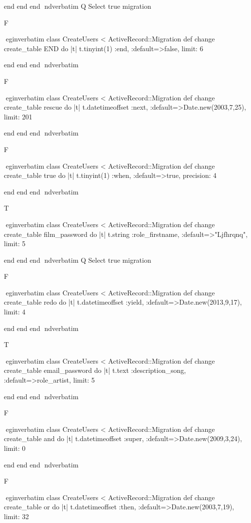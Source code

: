     end 
  end 
end
nd{verbatim}
Q
 Select true migration

F

egin{verbatim}
 class CreateUsers < ActiveRecord::Migration 
  def change 
    create_table END do |t| 
      t.tinyint(1) :end, :default=>false, limit: 6
    
    end 
  end 
end
nd{verbatim}

F

egin{verbatim}
 class CreateUsers < ActiveRecord::Migration 
  def change 
    create_table rescue do |t| 
      t.datetimeoffset :next, :default=>Date.new(2003,7,25), limit: 201
    
    end 
  end 
end
nd{verbatim}

F

egin{verbatim}
 class CreateUsers < ActiveRecord::Migration 
  def change 
    create_table true do |t| 
      t.tinyint(1) :when, :default=>true, precision: 4
    
    end 
  end 
end
nd{verbatim}

T

egin{verbatim}
 class CreateUsers < ActiveRecord::Migration 
  def change 
    create_table film_password do |t| 
      t.string :role_firstname, :default=>"Ljfhrqnq", limit: 5
    
    end 
  end 
end
nd{verbatim}
Q
 Select true migration

F

egin{verbatim}
 class CreateUsers < ActiveRecord::Migration 
  def change 
    create_table redo do |t| 
      t.datetimeoffset :yield, :default=>Date.new(2013,9,17), limit: 4
    
    end 
  end 
end
nd{verbatim}

T

egin{verbatim}
 class CreateUsers < ActiveRecord::Migration 
  def change 
    create_table email_password do |t| 
      t.text :description_song, :default=>role_artist, limit: 5
    
    end 
  end 
end
nd{verbatim}

F

egin{verbatim}
 class CreateUsers < ActiveRecord::Migration 
  def change 
    create_table and do |t| 
      t.datetimeoffset :super, :default=>Date.new(2009,3,24), limit: 0
    
    end 
  end 
end
nd{verbatim}

F

egin{verbatim}
 class CreateUsers < ActiveRecord::Migration 
  def change 
    create_table or do |t| 
      t.datetimeoffset :then, :default=>Date.new(2003,7,19), limit: 32
    
